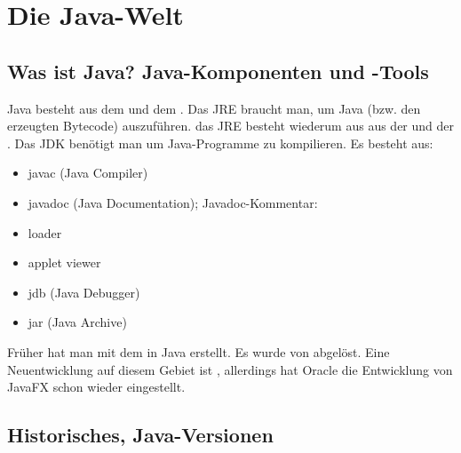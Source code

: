 
\chapter{Die Java-Welt}
\section{Was ist Java? Java-Komponenten und -Tools}

Java besteht aus dem  und dem .
Das JRE braucht man, um Java (bzw. den erzeugten Bytecode) auszuführen.
das JRE besteht wiederum aus aus der  und der .
Das JDK benötigt man um Java-Programme zu kompilieren.
Es besteht aus:
\begin{itemize}
	\item javac (Java Compiler)
	\item javadoc (Java Documentation); Javadoc-Kommentar: \code{/**$\ldots$*/}
	\item loader
	\item applet viewer
	\item jdb (Java Debugger)
	\item jar (Java Archive)
\end{itemize}

Früher hat man  mit dem  in Java erstellt.
Es wurde von  abgelöst.
Eine Neuentwicklung auf diesem Gebiet ist , allerdings hat Oracle die Entwicklung von JavaFX schon wieder eingestellt.

\section{Historisches, Java-Versionen}

